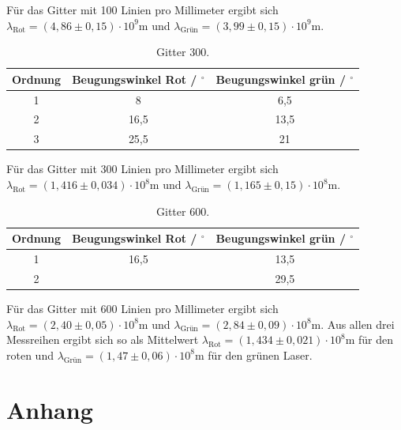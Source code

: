 \noindent
Für das Gitter mit 100 Linien pro Millimeter ergibt sich $\lambda_\text{Rot} = (4,86 \pm 0,15) \cdot 10^9 \si{\meter}$ und
$\lambda_\text{Grün} = (3,99 \pm 0,15) \cdot 10^9 \si{\meter}$.

\begin{table}[H]
  \centering
  \caption{Gitter 300.}
  \label{tab:git300}
  \begin{tabular}{c c c}
    \toprule
    Ordnung & Beugungswinkel Rot / $^{\circ}$ & Beugungswinkel grün / $^{\circ}$\\
    \midrule
    1 & 8 & 6,5\\
    2 & 16,5 & 13,5\\
    3 & 25,5 & 21\\
    \bottomrule
  \end{tabular}
\end{table}

\noindent
Für das Gitter mit 300 Linien pro Millimeter ergibt sich $\lambda_\text{Rot} = (1,416 \pm 0,034) \cdot 10^8 \si{\meter}$ und
$\lambda_\text{Grün} = (1,165 \pm 0,15) \cdot 10^8 \si{\meter}$.

\begin{table}[H]
  \centering
  \caption{Gitter 600.}
  \label{tab:git600}
  \begin{tabular}{c c c}
    \toprule
    Ordnung & Beugungswinkel Rot / $^{\circ}$ & Beugungswinkel grün / $^{\circ}$\\
    \midrule
    1 & 16,5 & 13,5\\
    2 & & 29,5\\
    \bottomrule
  \end{tabular}
\end{table}

\noindent
Für das Gitter mit 600 Linien pro Millimeter ergibt sich $\lambda_\text{Rot} = (2,40 \pm 0,05) \cdot 10^8 \si{\meter}$ und
$\lambda_\text{Grün} = (2,84 \pm 0,09) \cdot 10^8 \si{\meter}$.
\newline \newline
Aus allen drei Messreihen ergibt sich so als Mittelwert $\lambda_\text{Rot} = (1,434 \pm 0,021) \cdot 10^8 \si{\meter}$ für den roten und
$\lambda_\text{Grün} = (1,47 \pm 0,06) \cdot 10^8 \si{\meter}$ für den grünen Laser.

\printbibliography{}

\section*{Anhang}
\label{sec:anhang}

